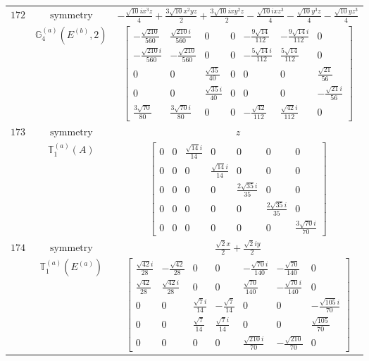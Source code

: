 \documentclass[fleqn,8pt,landscape]{jsarticle}
\begin{document}
\begin{longtable}{ccc}
$ 172 $ & $ \text{symmetry} $ & $ - \frac{\sqrt{10} i x^{3} z}{4} + \frac{3 \sqrt{10} x^{2} y z}{2} + \frac{3 \sqrt{10} i x y^{2} z}{2} - \frac{\sqrt{10} i x z^{3}}{4} - \frac{\sqrt{10} y^{3} z}{4} - \frac{\sqrt{10} y z^{3}}{4} $ \\
$  $ & $ \mathbb{G}_{4}^{(a)}(E^{(b)},2) $ & $ \begin{bmatrix} - \frac{\sqrt{210}}{560} & \frac{\sqrt{210} i}{560} & 0 & 0 & - \frac{9 \sqrt{14}}{112} & - \frac{9 \sqrt{14} i}{112} & 0 \\ - \frac{\sqrt{210} i}{560} & - \frac{\sqrt{210}}{560} & 0 & 0 & - \frac{5 \sqrt{14} i}{112} & \frac{5 \sqrt{14}}{112} & 0 \\ 0 & 0 & \frac{\sqrt{35}}{40} & 0 & 0 & 0 & \frac{\sqrt{21}}{56} \\ 0 & 0 & \frac{\sqrt{35} i}{40} & 0 & 0 & 0 & - \frac{\sqrt{21} i}{56} \\ \frac{3 \sqrt{70}}{80} & \frac{3 \sqrt{70} i}{80} & 0 & 0 & - \frac{\sqrt{42}}{112} & \frac{\sqrt{42} i}{112} & 0 \end{bmatrix} $ \\ \hline
$ 173 $ & $ \text{symmetry} $ & $ z $ \\
$  $ & $ \mathbb{T}_{1}^{(a)}(A) $ & $ \begin{bmatrix} 0 & 0 & \frac{\sqrt{14} i}{14} & 0 & 0 & 0 & 0 \\ 0 & 0 & 0 & \frac{\sqrt{14} i}{14} & 0 & 0 & 0 \\ 0 & 0 & 0 & 0 & \frac{2 \sqrt{35} i}{35} & 0 & 0 \\ 0 & 0 & 0 & 0 & 0 & \frac{2 \sqrt{35} i}{35} & 0 \\ 0 & 0 & 0 & 0 & 0 & 0 & \frac{3 \sqrt{70} i}{70} \end{bmatrix} $ \\ \hline
$ 174 $ & $ \text{symmetry} $ & $ \frac{\sqrt{2} x}{2} + \frac{\sqrt{2} i y}{2} $ \\
$  $ & $ \mathbb{T}_{1}^{(a)}(E^{(a)}) $ & $ \begin{bmatrix} \frac{\sqrt{42} i}{28} & - \frac{\sqrt{42}}{28} & 0 & 0 & - \frac{\sqrt{70} i}{140} & - \frac{\sqrt{70}}{140} & 0 \\ \frac{\sqrt{42}}{28} & \frac{\sqrt{42} i}{28} & 0 & 0 & \frac{\sqrt{70}}{140} & - \frac{\sqrt{70} i}{140} & 0 \\ 0 & 0 & \frac{\sqrt{7} i}{14} & - \frac{\sqrt{7}}{14} & 0 & 0 & - \frac{\sqrt{105} i}{70} \\ 0 & 0 & \frac{\sqrt{7}}{14} & \frac{\sqrt{7} i}{14} & 0 & 0 & \frac{\sqrt{105}}{70} \\ 0 & 0 & 0 & 0 & \frac{\sqrt{210} i}{70} & - \frac{\sqrt{210}}{70} & 0 \end{bmatrix} $ \\ \hline

\end{longtable}
\end{document}
